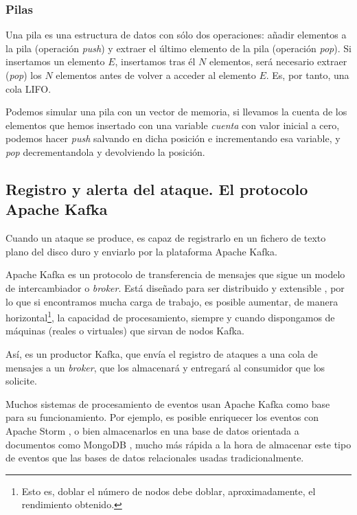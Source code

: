 \subsubsection{Pilas}
Una pila es una estructura de datos con sólo dos operaciones: añadir elementos a la pila (operación \emph{push}) y 
extraer el último elemento de la pila (operación \emph{pop}). Si insertamos un elemento $E$, insertamos tras él $N$ 
elementos, será necesario extraer (\emph{pop}) los $N$ elementos antes de volver a acceder al elemento $E$. Es, por 
tanto, una cola \gls{LIFO}.

Podemos simular una pila con un vector de memoria, si llevamos la cuenta de los elementos que hemos insertado con una 
variable \emph{cuenta} con valor inicial a cero, podemos hacer \emph{push} salvando en dicha posición e incrementando 
esa variable, y \emph{pop} decrementandola y devolviendo la posición.

\subsection{Registro y alerta del ataque. El protocolo Apache Kafka}
Cuando un ataque se produce, \redborderddos{} es capaz de registrarlo en un fichero de texto plano del disco duro y 
enviarlo por la plataforma Apache Kafka.

Apache Kafka es un protocolo de transferencia de mensajes que sigue un modelo de intercambiador o 
\emph{broker}. Está diseñado para ser distribuido y extensible \cite{ApacheKafka}, por lo que si 
encontramos mucha carga de trabajo, es posible aumentar, de manera horizontal\footnote{Esto es, doblar el número de 
nodos debe doblar, aproximadamente, el rendimiento obtenido.}, la capacidad de procesamiento, siempre y cuando 
dispongamos de máquinas (reales o virtuales) que sirvan de nodos Kafka.

Así, \redborderddos{} es un productor Kafka, que envía el registro de ataques a una cola de mensajes a un 
\emph{broker}, que los almacenará y entregará al consumidor que los solicite.

Muchos sistemas de procesamiento de eventos usan Apache Kafka como base para su funcionamiento. Por ejemplo, es posible 
enriquecer los eventos con Apache Storm \cite{ApacheStorm}, o bien almacenarlos en una base de 
datos orientada a documentos como MongoDB \cite{MongoDB}, mucho más rápida a la hora de almacenar este 
tipo de eventos que las bases de datos relacionales usadas tradicionalmente.

